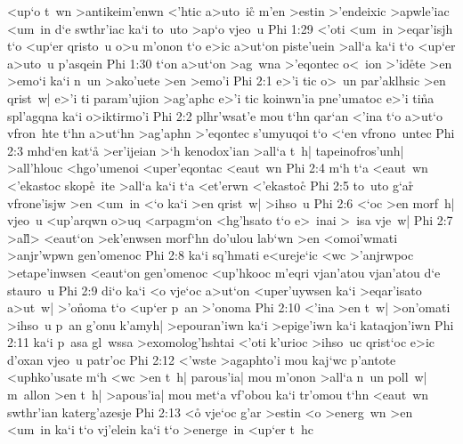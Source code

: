 <up`o
t~wn
>antikeim'enwn
<'htic
a>uto~ic\r{}
m'en
>estin
>'endeixic
>apwle'iac
<um~in
d`e
swthr'iac
ka`i
to~uto
>ap`o
vjeo~u\bibvsend
\vs Phi 1:29
<'oti
<um~in
>eqar'isjh
t`o
<up`er
qristo~u
o>u
m'onon
t`o
e>ic
a>ut`on
piste'uein
>all`a
ka`i
t`o
<up`er
a>uto~u
p'asqein\bibvsend
\vs Phi 1:30
t`on
a>ut`on
>ag~wna
>'eqontec
o<~ion
>'id\r{e}te
>en
>emo`i
ka`i
n~un
>ako'uete
>en
>emo'i\bibvsend
\vs Phi 2:1
e>'i
tic
o>~un
par'aklhsic
>en
qrist~w|
e>'i
ti
param'ujion
>ag'aphc
e>'i
tic
koinwn'ia
pne'umatoc
e>'i
ti\r{n}a
spl'agqna
ka`i
o>iktirmo'i\bibvsend
\vs Phi 2:2
plhr'wsat'e
mou
t`hn
qar`an
<'ina
t`o
a>ut`o
vfron~hte
t`hn
a>ut`hn
>ag'aphn
>'eqontec
s'umyuqoi
t`o
<`en
vfrono~untec\bibvsend
\vs Phi 2:3
mhd`en
kat`a\r{}
>er'ijeian
>`h
kenodox'ian
>all`a
t~h|
tapeinofros'unh|
>all'hlouc
<hgo'umenoi
<uper'eqontac
<eaut~wn\bibvsend
\vs Phi 2:4
m`h
t`a
<eaut~wn
<'ekastoc
skop\r{e}~ite
>all`a
ka`i
t`a
<et'erwn
<'ekasto\r{c}\bibvsend
{}
\vs Phi 2:5
to~uto
g`ar\r{}
vfrone'isjw
>en
<um~in
<`o
ka`i
>en
qrist~w|
>ihso~u\bibvsend
\vs Phi 2:6
<`oc
>en
morf~h|
vjeo~u
<up'arqwn
o>uq
<arpagm`on
<hg'hsato
t`o
e>~inai
>~isa
vje~w|\bibvsend
\vs Phi 2:7
>al\r{l}>
<eaut`on
>ek'enwsen
morf`hn
do'ulou
lab`wn
>en
<omoi'wmati
>anjr'wpwn
gen'omenoc\bibvsend
\vs Phi 2:8
ka`i
sq'hmati
e<ureje`ic
<wc
>'anjrwpoc
>etape'inwsen
<eaut`on
gen'omenoc
<up'hkooc
m'eqri
vjan'atou
vjan'atou
d`e
stauro~u\bibvsend
\vs Phi 2:9
di`o
ka`i
<o
vje`oc
a>ut`on
<uper'uywsen
ka`i
>eqar'isato
a>ut~w|
>'o\r{n}oma
t`o
<up`er
p~an
>'onoma\bibvsend
\vs Phi 2:10
<'ina
>en
t~w|
>on'omati
>ihso~u
p~an
g'onu
k'amyh|
>epouran'iwn
ka`i
>epige'iwn
ka`i
kataqjon'iwn\bibvsend
\vs Phi 2:11
ka`i
p~asa
gl~wssa
>exomolog'hshtai
<'oti
k'urioc
>ihso~uc
qrist`oc
e>ic
d'oxan
vjeo~u
patr'oc\bibvsend
\vs Phi 2:12
<'wste
>agaphto'i
mou
kaj`wc
p'antote
<uphko'usate
m`h
<wc
>en
t~h|
parous'ia|
mou
m'onon
>all`a
n~un
poll~w|
m~allon
>en
t~h|
>apous'ia|
mou
met`a
vf'obou
ka`i
tr'omou
t`hn
<eaut~wn
swthr'ian
katerg'azesje\bibvsend
\vs Phi 2:13
<o\r{}
vje`oc
g'ar
>estin
<o
>energ~wn
>en
<um~in
ka`i
t`o
vj'elein
ka`i
t`o
>energe~in
<up`er
t~hc
